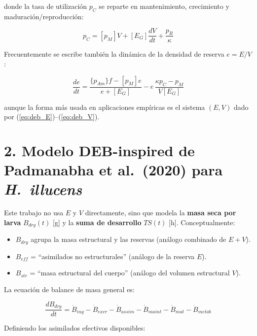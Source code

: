 \documentclass[11pt,a4paper]{article}
\begin{document}
donde la tasa de utilización $p_C$ se reparte en mantenimiento, crecimiento y maduración/reproducción:

\begin{equation}
    p_C = [p_M]V + [E_G]\frac{dV}{dt} + \frac{p_R}{\kappa}
    \label{eq:deb_pc}
\end{equation}

Frecuentemente se escribe también la dinámica de la densidad de reserva $e=E/V$:

\begin{equation}
    \frac{de}{dt} = \frac{\{p_{Am}\}f - [p_M]e}{e + [E_G]} - e\,\frac{\kappa p_C - p_M}{V[E_G]}
    \label{eq:deb_e}
\end{equation}

aunque la forma más usada en aplicaciones empíricas es el sistema $(E,V)$ dado por (\ref{eq:deb_E})--(\ref{eq:deb_V}).

\section{2. Modelo DEB-inspired de Padmanabha et al.\ (2020) para \textit{H.~illucens}}

Este trabajo no usa $E$ y $V$ directamente, sino que modela la \textbf{masa seca por larva} $B_{dry}(t)$ [g] y la \textbf{suma de desarrollo} $TS(t)$ [h]. Conceptualmente:

\begin{itemize}
    \item $B_{dry}$ agrupa la masa estructural y las reservas (análogo combinado de $E+V$).
    \item $B_{eff}$ = ``asimilados no estructurales'' (análogo de la reserva $E$).
    \item $B_{str}$ = ``masa estructural del cuerpo'' (análogo del volumen estructural $V$).
\end{itemize}

La ecuación de balance de masa general es:

\begin{equation}
    \frac{dB_{dry}}{dt} = \dot{B}_{ing}
    - \dot{B}_{excr}
    - \dot{B}_{assim}
    - \dot{B}_{maint}
    - \dot{B}_{mat}
    - \dot{B}_{metab}
    \label{eq:pad_balance}
\end{equation}

Definiendo los asimilados efectivos disponibles:
\end{document}
